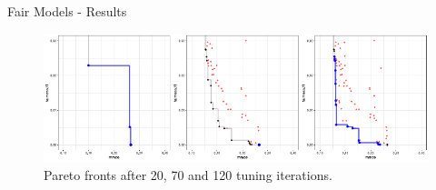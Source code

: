 \begin{frame}{Fair Models - Results}

  \begin{figure}
    \centering
    \includegraphics[scale=1.2]{images/Pfisterer_et_al_2019_Multi_Objective_fig4.pdf}
    \caption{Pareto fronts after 20, 70 and 120 tuning iterations.}
  \end{figure}

\end{frame}




